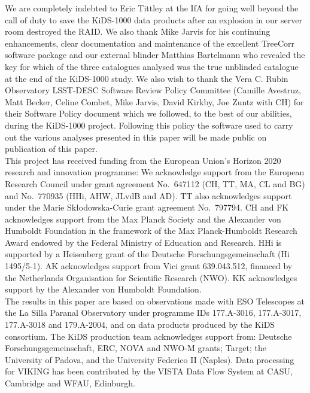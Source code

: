 \documentclass{aa}
\begin{document}

   \maketitle
%





\begin{acknowledgements}
We are completely indebted to Eric Tittley at the IfA for going well beyond the call of duty to save the KiDS-1000 data products after an explosion in our server room destroyed the RAID.   We also thank
Mike Jarvis for his continuing enhancements, clear documentation and maintenance of the excellent {\sc TreeCorr} software package and our external blinder Matthias Bartelmann who revealed the key for which of the three catalogues analysed was the true unblinded catalogue at the end of the KiDS-1000 study.   We also wish to thank the Vera C. Rubin Observatory LSST-DESC Software Review Policy Committee (Camille Avestruz, Matt Becker, Celine Combet, Mike Jarvis, David Kirkby, Joe Zuntz with CH) for their Software Policy document which we followed, to the best of our abilities, during the KiDS-1000 project.   Following this policy the software used to carry out the various analyses presented in this paper will be made public on publication of this paper.\\

This project has received funding from the European Union's Horizon 2020 research and innovation programme: We acknowledge support from the European Research Council under grant agreement No.~647112 (CH, TT, MA, CL and BG) and No.~770935 (HHi, AHW, JLvdB and AD). TT also acknowledges support under the Marie Sk\l{}odowska-Curie grant agreement No.~797794. CH and FK acknowledges support from the Max Planck Society and the Alexander von Humboldt Foundation in the framework of the Max Planck-Humboldt Research Award endowed by the Federal Ministry of Education and Research. HHi is supported by a Heisenberg grant of the Deutsche Forschungsgemeinschaft (Hi 1495/5-1). AK acknowledges support from Vici grant 639.043.512, financed by the Netherlands Organisation for Scientific Research (NWO). KK acknowledges support by the Alexander von Humboldt Foundation.\\
%
The results in this paper are based on observations made with ESO Telescopes at the La Silla Paranal Observatory under programme IDs 177.A-3016, 177.A-3017, 177.A-3018 and 179.A-2004, and on data products produced by the KiDS consortium. The KiDS production team acknowledges support from: Deutsche Forschungsgemeinschaft, ERC, NOVA and NWO-M grants; Target; the University of Padova, and the University Federico II (Naples).  Data processing for VIKING has been contributed by the VISTA Data Flow System at CASU, Cambridge and WFAU, Edinburgh. 


\end{acknowledgements}
\end{document}
